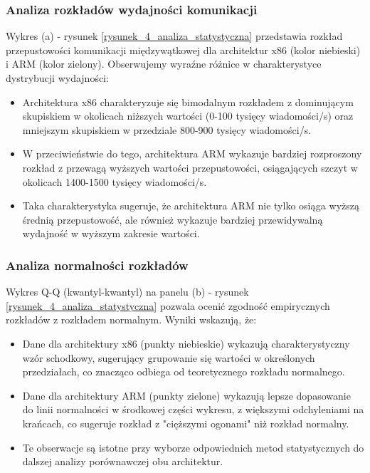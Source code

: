 \subsubsection{Analiza rozkładów wydajności komunikacji}
Wykres (a) - rysunek \ref{rysunek_4_analiza_statystyczna} przedstawia rozkład przepustowości komunikacji międzywątkowej dla architektur x86 (kolor niebieski) i ARM (kolor zielony). Obserwujemy wyraźne różnice w charakterystyce dystrybucji wydajności:
\begin{itemize}
    \item Architektura x86 charakteryzuje się bimodalnym rozkładem z dominującym skupiskiem w okolicach niższych wartości (0-100 tysięcy wiadomości/s) oraz mniejszym skupiskiem w przedziale 800-900 tysięcy wiadomości/s.
    \item W przeciwieństwie do tego, architektura ARM wykazuje bardziej rozproszony rozkład z przewagą wyższych wartości przepustowości, osiągających szczyt w okolicach 1400-1500 tysięcy wiadomości/s.
    \item Taka charakterystyka sugeruje, że architektura ARM nie tylko osiąga wyższą średnią przepustowość, ale również wykazuje bardziej przewidywalną wydajność w wyższym zakresie wartości.
\end{itemize}

\subsubsection{Analiza normalności rozkładów}
Wykres Q-Q (kwantyl-kwantyl) na panelu (b) - rysunek \ref{rysunek_4_analiza_statystyczna} pozwala ocenić zgodność empirycznych rozkładów z rozkładem normalnym. Wyniki wskazują, że:
\begin{itemize}
    \item Dane dla architektury x86 (punkty niebieskie) wykazują charakterystyczny wzór schodkowy, sugerujący grupowanie się wartości w określonych przedziałach, co znacząco odbiega od teoretycznego rozkładu normalnego.
    \item Dane dla architektury ARM (punkty zielone) wykazują lepsze dopasowanie do linii normalności w środkowej części wykresu, z większymi odchyleniami na krańcach, co sugeruje rozkład z "cięższymi ogonami" niż rozkład normalny.
    \item Te obserwacje są istotne przy wyborze odpowiednich metod statystycznych do dalszej analizy porównawczej obu architektur.
\end{itemize}

